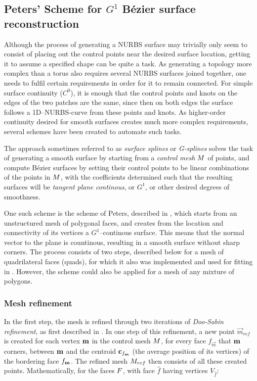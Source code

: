 \subsection{Peters' Scheme for $G^1$ B{\'e}zier surface reconstruction}
\label{subsec:peters}
Although the process of generating a NURBS surface may trivially only seem to consist of placing out the control points near the desired surface location, getting it to assume a specified shape can be quite a task. As generating a topology more complex than a torus  also requires several NURBS surfaces joined together, one needs to fulfil certain requirements in order for it to remain connected. For simple surface continuity ($C^0$), it is enough that the control points and knots on the edges of the two patches are the same, since then on both edges the surface follows a 1D--NURBS-curve from these points and knots. As higher-order continuity desired for smooth surfaces creates much more complex requirements, several schemes have been created to automate such tasks.

The approach sometimes referred to as \emph{surface splines} or \emph{G-splines} \cite{eck1996automatic} solves the task of generating a smooth surface by starting from a \emph{control mesh} $\petersControlMesh$ of points, and compute B{\'e}zier surfaces by setting their control points to be linear combinations of the points in $\petersControlMesh$, with the coefficients determined such that the resulting surfaces will be \emph{tangent plane continous}, or $G^1$, or other desired degrees of smoothness. 

One such scheme is the scheme of Peters, described in \cite{peters1992constructing}, which starts from an unstructured mesh of polygonal faces, and creates from the location and connectivity of its vertices a $G^1$--continous surface. This means that the normal vector to the plane is countinous, resulting in a smooth surface without sharp corners. The process consists of two steps, described below for a mesh of quadrilateral faces (quads), for which it also was implemented and used for fitting in \cite{eck1996automatic}. However, the scheme could also be applied for a mesh of any mixture of polygons.

\subsubsection{Mesh refinement}
In the first step, the mesh is refined through two iterations of \emph{Doo-Sabin refinement}, as first described in \cite{DooSabin1978subdiv}. In one step of this refinement, a new point $\vec{m}_{ref}$  is created for each vertex $\petersControlMeshVec$ in the control mesh $\petersControlMesh$, for every face $f_{\vec{m}}$ that $\petersControlMeshVec$ corners,  between $\petersControlMeshVec$ and the centroid $\centroidof{f_{\petersControlMeshVec}}$ (the average position of its vertices) of the bordering face $f_{\petersControlMeshVec}$. The refined mesh $\petersControlMeshRef$ then consists of all these created points. Mathematically, for the faces $\petersFaces$, with face ${\hat{f}}$ having vertices $V_{\hat{f}}$:

